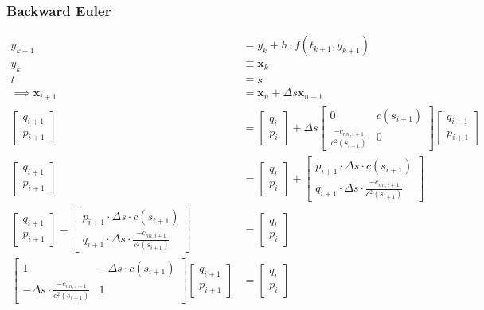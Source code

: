 \documentclass{article}
\begin{document}
\subsubsection{Backward Euler}
\begin{align*}
  y_{k+1} &= y_k + h\cdot f(t_{k+1}, y_{k+1}) \\
  y_k &\equiv \bm{x}_k\\
  t &\equiv s\\
  \implies \bm{x}_{i+1} &= \bm{x}_n + \Delta s\dot{\bm{x}}_{n+1} \\ 
  \begin{bmatrix} q_{i+1} \\ p_{i+1} \end{bmatrix} &= \begin{bmatrix} q_{i} \\ p_{i} \end{bmatrix} + \Delta s \begin{bmatrix} 0 & c(s_{i+1}) \\ \frac{-c_{nn,i+1}}{c^2(s_{i+1})} & 0\end{bmatrix}\begin{bmatrix} q_{i+1} \\ p_{i+1} \end{bmatrix} \\
  \begin{bmatrix} q_{i+1} \\ p_{i+1} \end{bmatrix} &= \begin{bmatrix} q_{i} \\ p_{i} \end{bmatrix} + \begin{bmatrix} p_{i+1}\cdot\Delta s\cdot c(s_{i+1}) \\ q_{i+1}\cdot\Delta s\cdot\frac{-c_{nn,i+1}}{c^2(s_{i+1})} \end{bmatrix}\\
  \begin{bmatrix} q_{i+1} \\ p_{i+1} \end{bmatrix} - \begin{bmatrix} p_{i+1}\cdot\Delta s\cdot c(s_{i+1}) \\ q_{i+1}\cdot\Delta s\cdot\frac{-c_{nn,i+1}}{c^2(s_{i+1})} \end{bmatrix} &= \begin{bmatrix} q_{i} \\ p_{i} \end{bmatrix} \\
  \begin{bmatrix} 1 & -\Delta s\cdot c(s_{i+1}) \\ -\Delta s\cdot\frac{-c_{nn,i+1}}{c^2(s_{i+1})} & 1 \end{bmatrix} \begin{bmatrix}q_{i+1} \\ p_{i+1} \end{bmatrix} &= \begin{bmatrix} q_i \\ p_i \end{bmatrix}
\end{align*}
\end{document}
